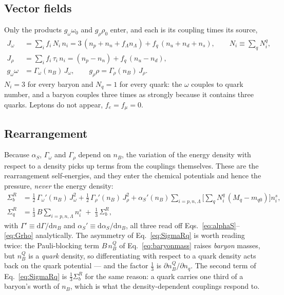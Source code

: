 \documentclass[aps,prc,onecolumn,superscriptaddress,nofootinbib,10pt]{revtex4-2}
\newcommand{\nB}{n_B}
\newcommand{\SR}{\Sigma^{R}}
\begin{document}
\subsection{Vector fields}

Only the products $g_\omega\omega_0$ and $g_\rho\rho_0$ enter, and each is its
coupling times its source,
%
\begin{align}
J_\omega &= \sum_i f_i\, N_i\, n_i
          = 3\,(n_p + n_n + f_\Lambda n_\Lambda)
            + f_q\,(n_u + n_d + n_s) ,
\qquad N_i \equiv \sum_q N^q_i ,
\label{eq:Jomega}\\
J_\rho   &= \sum_i f_i\, \tau_i\, n_i
          = (n_p - n_n) + f_q\,(n_u - n_d) ,
\label{eq:Jrho}\\
g_\omega\omega &= \Gamma_\omega(\nB)\, J_\omega ,
\qquad
g_\rho\rho     = \Gamma_\rho(\nB)\, J_\rho .
\label{eq:fields}
\end{align}
%
$N_i = 3$ for every baryon and $N_q = 1$ for every quark: the $\omega$ couples
to quark number, and a baryon couples three times as strongly because it
contains three quarks. Leptons do not appear, $f_e = f_\mu = 0$.

\subsection{Rearrangement}

Because $\alpha_S$, $\Gamma_\omega$ and $\Gamma_\rho$ depend on $\nB$, the
variation of the energy density with respect to a density picks up terms from
the couplings themselves. These are the rearrangement self-energies, and they
enter the chemical potentials and hence the pressure, \emph{never} the energy
density:
%
\begin{align}
\SR_b &= \tfrac12\,\Gamma_\omega'(\nB)\, J_\omega^2
       + \tfrac12\,\Gamma_\rho'(\nB)\, J_\rho^2
       + \alpha_S'(\nB) \sum_{i = p,n,\Lambda}
         \Big[\sum_q N^q_i\,(M_q - m_{q0})\Big] n^s_i ,
\label{eq:SigmaRb}\\
\SR_q &= \tfrac13\, B \sum_{i = p,n,\Lambda} n^s_i
       \;+\; \tfrac13\, \SR_b ,
\label{eq:SigmaRq}
\end{align}
%
with $\Gamma' \equiv \mathrm{d}\Gamma/\mathrm{d}\nB$ and
$\alpha_S' \equiv \mathrm{d}\alpha_S/\mathrm{d}\nB$, all three read off
Eqs.~\eqref{eq:alphaS}--\eqref{eq:Grho} analytically. The asymmetry of
Eq.~\eqref{eq:SigmaRq} is worth reading twice: the Pauli-blocking term
$B\,\nB^Q$ of Eq.~\eqref{eq:baryonmass} raises \emph{baryon} masses, but
$\nB^Q$ is a \emph{quark} density, so differentiating with respect to a quark
density acts back on the quark potential --- and the factor $\tfrac13$ is
$\partial \nB^Q/\partial n_q$. The second term of Eq.~\eqref{eq:SigmaRq} is
$\tfrac13\SR_b$ for the same reason: a quark carries one third of a baryon's
worth of $\nB$, which is what the density-dependent couplings respond to.
\end{document}
